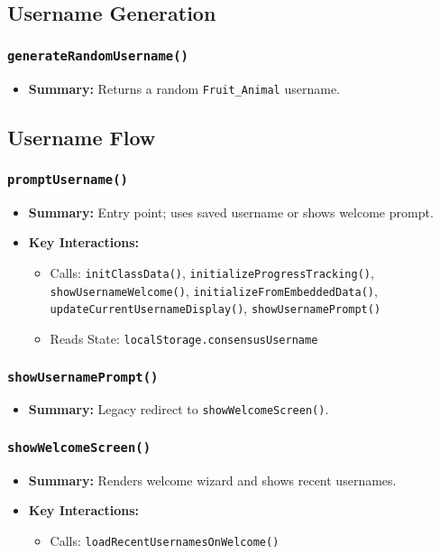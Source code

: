 \documentclass[11pt,letterpaper]{article}
\begin{document}
\subsection{Username Generation}

\subsubsection{\texttt{generateRandomUsername()}}
\begin{itemize}
    \item \textbf{Summary:} Returns a random \texttt{Fruit\_Animal} username.
\end{itemize}

\subsection{Username Flow}

\subsubsection{\texttt{promptUsername()}}
\begin{itemize}
    \item \textbf{Summary:} Entry point; uses saved username or shows welcome prompt.
    \item \textbf{Key Interactions:}
    \begin{itemize}
        \item Calls: \texttt{initClassData()}, \texttt{initializeProgressTracking()}, \texttt{showUsernameWelcome()}, \texttt{initializeFromEmbeddedData()}, \texttt{updateCurrentUsernameDisplay()}, \texttt{showUsernamePrompt()}
        \item Reads State: \texttt{localStorage.consensusUsername}
    \end{itemize}
\end{itemize}

\subsubsection{\texttt{showUsernamePrompt()}}
\begin{itemize}
    \item \textbf{Summary:} Legacy redirect to \texttt{showWelcomeScreen()}.
\end{itemize}

\subsubsection{\texttt{showWelcomeScreen()}}
\begin{itemize}
    \item \textbf{Summary:} Renders welcome wizard and shows recent usernames.
    \item \textbf{Key Interactions:}
    \begin{itemize}
        \item Calls: \texttt{loadRecentUsernamesOnWelcome()}
    \end{itemize}
\end{itemize}
\end{document}
